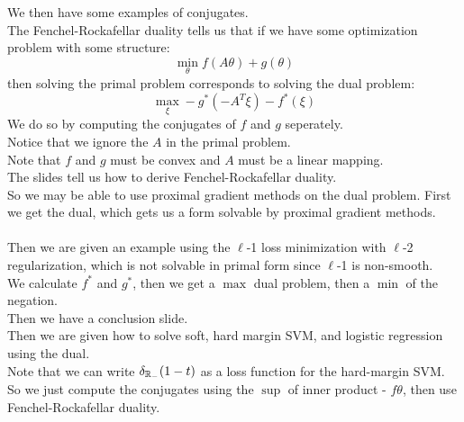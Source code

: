 \documentclass[12pt]{article}
\begin{document}
We then have some examples of conjugates. \\

The Fenchel-Rockafellar duality tells
us that if we have some optimization problem
with some structure:
\[ \min_\theta f(A\theta) + g(\theta) \]
then solving the primal problem corresponds
to solving the dual problem:
\[ \max_\xi - g^*(-A^T\xi) - f^*(\xi) \]
We do so by computing the conjugates of $f$
and $g$ seperately. \\
Notice that we ignore the $A$
in the primal problem. \\
Note that $f$ and $g$ must be convex
and $A$ must be a linear mapping. \\

The slides tell us how to derive
Fenchel-Rockafellar duality. \\

So we may be able to use proximal gradient
methods on the dual problem.
First we get the dual, which 
gets us a form solvable by proximal gradient
methods. \\

 \\

Then we are given an example using the
$\ell$-1 loss minimization with $\ell$-2
regularization, which is not solvable
in primal form since $\ell$-1 is non-smooth. \\

We calculate $f^*$ and $g^*$,
then we get a $\max$ dual problem, 
then a $\min$ of the negation. \\

Then we have a conclusion slide. \\

Then we are given how to solve soft,
hard margin SVM, and logistic regression
using the dual. \\

Note that we can write $\delta_{\mathbb{R}_-}(1-t)$
as a loss function for the hard-margin SVM. \\

So we just compute the conjugates
using the $\sup$ of inner product - $f\theta$,
then use Fenchel-Rockafellar duality. \\
\end{document}
